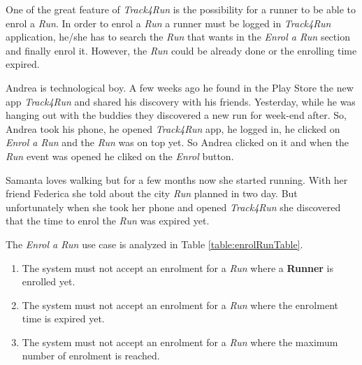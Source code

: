 One of the great feature of \textit{Track4Run} is the possibility for a runner to be able to enrol a \textit{Run}. In order to enrol a \textit{Run} a runner must be logged in \textit{Track4Run} application, he/she has to search the \textit{Run} that wants in the \textit{Enrol a Run} section and finally enrol it. However, the \textit{Run} could be already done or the enrolling time expired.

Andrea is technological boy. A few weeks ago he found in the Play Store the new app \textit{Track4Run} and shared his discovery with his friends. Yesterday, while he was hanging out with the buddies they discovered a new run for week-end after. So, Andrea took his phone, he opened \textit{Track4Run} app, he logged in, he clicked on \textit{Enrol a Run} and the \textit{Run} was on top yet. So Andrea clicked on it and when the \textit{Run} event was opened he cliked on the \textit{Enrol} button.

Samanta loves walking but for a few months now she started running. With her friend Federica she told about the city \textit{Run} planned in two day. But unfortunately when she took her phone and opened \textit{Track4Run} she discovered that the time to enrol the \textit{Run} was expired yet.

The \textit{Enrol a Run} use case is analyzed in Table \ref{table:enrolRunTable}.

\begin{enumerate}
  \item[] The system must not accept an enrolment for a \textit{Run} where a \textbf{Runner} is enrolled yet.
  \item[] The system must not accept an enrolment for a \textit{Run} where the enrolment time is expired yet.
  \item[] The system must not accept an enrolment for a \textit{Run} where the maximum number of enrolment is reached.
\end{enumerate}

